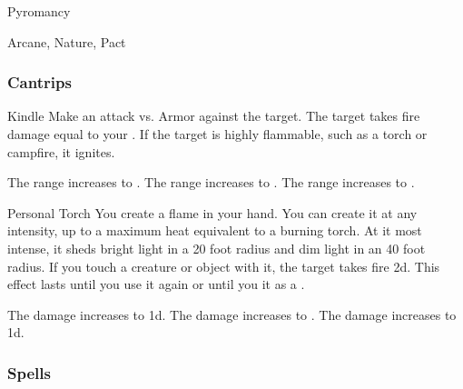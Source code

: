 \newpage
\begin{spellsection}{Pyromancy}

\begin{spellheader}
\end{spellheader}


 Arcane, Nature, Pact

\subsubsection{Cantrips}


\begin{freeability}{Kindle}
Make an attack vs. Armor against the target.
\hit The target takes fire damage equal to your .
If the target is highly flammable, such as a torch or campfire, it ignites.

\rankline
{} The range increases to \rngmed.
 The range increases to \rnglong.
 The range increases to \rngext.
\end{freeability}


\begin{freeability}{Personal Torch}
You create a flame in your hand.
You can create it at any intensity, up to a maximum heat equivalent to a burning torch.
At it most intense, it sheds bright light in a 20 foot radius and dim light in an 40 foot radius.
If you touch a creature or object with it, the target takes fire  \minus2d.
This effect lasts until you use it again or until you  it as a .

\rankline
{} The damage increases to  \minus1d.
 The damage increases to .
 The damage increases to  \plus1d.
\end{freeability}

\end{spellsection}


\subsubsection{Spells}


